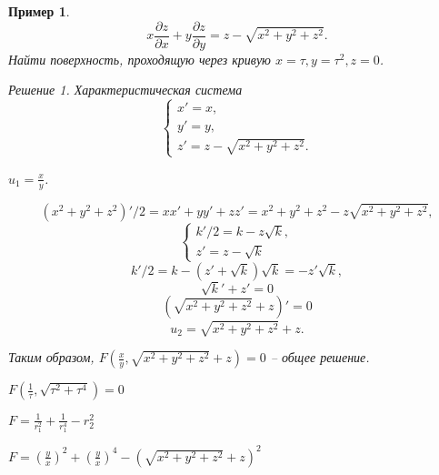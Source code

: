 \documentclass[a5paper, 10pt]{article}
\theoremstyle{definition}
\theoremstyle{plain}
\newtheorem{Ex}{Пример}
\theoremstyle{remark}
\newtheorem*{Solution}{Решение}
\begin{document}
    \begin{Ex}
        \[
            x \frac{\partial z}{\partial x} + y \frac{\partial z}{\partial y} = z- \sqrt{x^2+y^2+z^2}.      
        \]
        Найти поверхность, проходящую через кривую $x=\tau, y=\tau^2, z=0$. 
        \begin{Solution}
           Характеристическая система 
           \[
           \begin{cases}
               x'=x,\\
               y'=y,\\
               z'=z-\sqrt{x^2+y^2+z^2}.
           \end{cases}
           \] 
           
           $u_1 = \frac{x}{y}$.

           \[
               (x^2+y^2+z^2)'/2= xx'+yy'+zz' = x^2+y^2+z^2-z\sqrt{x^2+y^2+z^2},
           \] 
           \[
                \begin{cases}
                    k'/2 = k - z\sqrt{k},\\
                    z' = z-\sqrt{k}
                \end{cases}           
           \] 
           \[
               k'/2 = k-(z'+\sqrt{k})\sqrt{k} = -z'\sqrt{k},
           \] 
\[
    \sqrt{k}' + z' = 0
\] 
\[
    (\sqrt{x^2+y^2+z^2}+z)' = 0
\] 
\[
u_2= \sqrt{x^2+y^2+z^2}+z.
\] 

Таким образом, $F(\frac{x}{y}, \sqrt{x^2+y^2+z^2}+z) = 0$ -- общее решение.

$F(\frac1{\tau}, \sqrt{\tau^2 + \tau^4}) = 0$

$F = \frac{1}{r_1^2} + \frac{1}{r_1^4} - r_2^2$

$F = (\frac{y}{x})^2 + (\frac{y}{x})^4 - (\sqrt{x^2+y^2+z^2}+z)^2$
           
        \end{Solution}
    \end{Ex}
\end{document}

